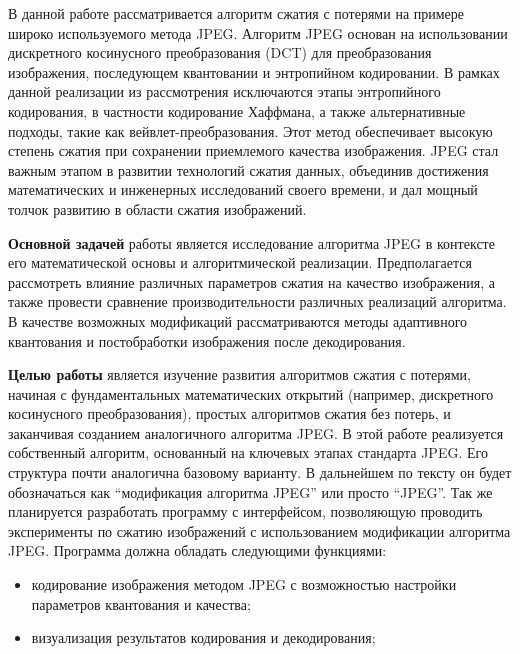 В данной работе рассматривается алгоритм сжатия с потерями на примере широко используемого метода JPEG. 
Алгоритм JPEG основан на использовании дискретного косинусного преобразования (DCT) для преобразования изображения, последующем квантовании и энтропийном кодировании. 
В рамках данной реализации из рассмотрения исключаются этапы энтропийного кодирования, в частности кодирование Хаффмана, а также альтернативные подходы, такие как вейвлет-преобразования.
Этот метод обеспечивает высокую степень сжатия при сохранении приемлемого качества изображения. 
JPEG стал важным этапом в развитии технологий сжатия данных, объединив достижения математических и инженерных исследований своего времени, и дал мощный толчок развитию в области сжатия изображений.

\vspace{1em}

\textbf{Основной задачей} работы является исследование алгоритма JPEG в контексте его математической основы и алгоритмической реализации. 
Предполагается рассмотреть влияние различных параметров сжатия на качество изображения, а также провести сравнение производительности различных реализаций алгоритма. 
В качестве возможных модификаций рассматриваются методы адаптивного квантования и постобработки изображения после декодирования.

\vspace{1em}
\textbf{Целью работы} является изучение развития алгоритмов сжатия с потерями, начиная с фундаментальных математических открытий (например, дискретного косинусного преобразования), простых алгоритмов сжатия без потерь, и заканчивая созданием аналогичного алгоритма JPEG. 
В этой работе реализуется собственный алгоритм, основанный на ключевых этапах стандарта JPEG. 
Его структура почти аналогична базовому варианту. 
В дальнейшем по тексту он будет обозначаться как “модификация алгоритма JPEG” или просто “JPEG”. 
Так же планируется разработать программу с интерфейсом, позволяющую проводить эксперименты по сжатию изображений с использованием модификации алгоритма JPEG.
Программа должна обладать следующими функциями:


\begin{itemize}[label=--]
    \item кодирование изображения методом JPEG с возможностью настройки параметров квантования и качества;
    \item визуализация результатов кодирования и декодирования;
\end{itemize}


